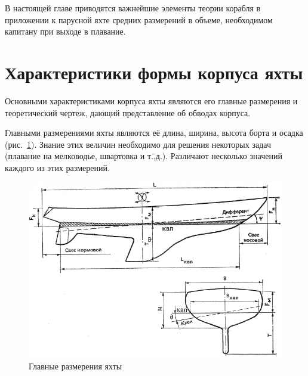 \documentclass[a4paper, 12pt, twoside, final, book, russian, fittopage, cyremdash]{ncc}
\newcommand{\ris}[1]{\ref{fig:#1}}
\begin{document}
В настоящей главе приводятся важнейшие элементы теории корабля в приложении к парусной яхте средних размерений в объеме, необходимом капитану при выходе в плавание.

\section{Характеристики формы корпуса яхты}

Основными характеристиками корпуса яхты являются его главные размерения и теоретический чертеж, дающий представление об обводах корпуса.

Главными размерениями яхты являются её длина, ширина, высота борта и осадка (рис.~\ris{1}). Знание этих величин необходимо для решения некоторых задач (плавание на мелководье, швартовка и т.\=,д.). Различают несколько значений каждого из этих размерений.

\begin{figure}[htb]
   \centering
   \includegraphics[scale=1.3]{0001P.pdf}
   \caption{Главные размерения яхты}
   \label{fig:1}
\end{figure}
\end{document}
